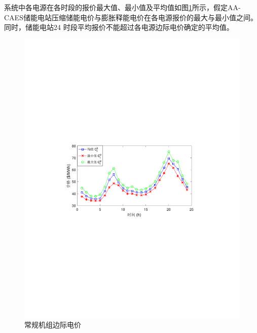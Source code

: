 
系统中各电源在各时段的报价最大值、最小值及平均值如图\ref{fig:AA-CAES-PAB-Price}所示，假定AA-CAES储能电站压缩储能电价与膨胀释能电价在各电源报价的最大与最小值之间。同时，储能电站24 时段平均报价不能超过各电源边际电价确定的平均值。

\begin{figure}[H] %
  \centering
  \includegraphics[scale=0.72]{figures/Chap3-10-PAB-Price.pdf}
  \caption{常规机组边际电价}
  \label{fig:AA-CAES-PAB-Price}
\end{figure}

